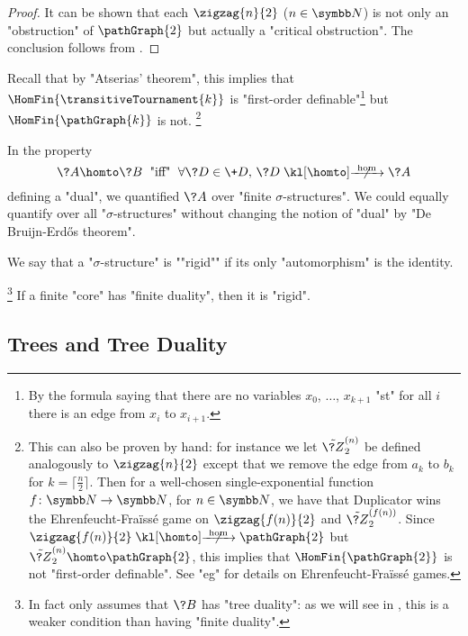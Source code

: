 \begin{proof}
	It can be shown that each $\zigzag{n}{2}$ ($n\in\N$) is not only an "obstruction" of
	$\pathGraph{2}$ but actually a "critical obstruction". The conclusion follows
	from .
\end{proof}
Recall that by "Atserias' theorem", this implies that
$\HomFin{\transitiveTournament{k}}$ is "first-order definable"\footnote{By the formula saying that
there are no variables $x_0$, $\dotsc$, $x_{k+1}$ "st" for all $i$ there is an edge from $x_i$ to $x_{i+1}$.} but $\HomFin{\pathGraph{k}}$ is not.%
\footnote{This can also be proven by hand: for 
instance we let $\tilde{\?Z}^{(n)}_2$ be defined analogously to $\zigzag{n}{2}$ except
that we remove the edge from $a_{k}$ to $b_k$ for $k = \lceil \frac{n}{2} \rceil$. 
Then for a well-chosen single-exponential function $f\colon \N \to \N$, for $n\in\N$,
we have that Duplicator wins the Ehrenfeucht-Fraïssé game on $\zigzag{f(n)}{2}$ and
$\tilde{\?Z}^{(f(n))}_2$. Since $\zigzag{f(n)}{2} \nothomto \pathGraph{2}$ but
$\tilde{\?Z}^{(n)}_2 \homto \pathGraph{2}$, this implies that $\HomFin{\pathGraph{2}}$ is not 
"first-order definable". See "eg" \cite[\S~3]{Kolaitis2007FiniteModelTheory} for details on
Ehrenfeucht-Fraïssé games.}


\begin{remark}
	In the property
	\[
		\?A \homto \?B
		\;\text{ "iff" }\;
		\forall \?D \in \+D,\, \?D \nothomto \?A
	\]
	defining a "dual", we quantified $\?A$ over "finite $\sigma$-structures". 
	We could equally quantify over all "$\sigma$-structures" without changing the notion of "dual" by "De Bruijn-Erdős theorem".
\end{remark}

We say that a "$\sigma$-structure" is \AP""rigid"" if its only "automorphism"
is the identity.
\begin{proposition}
	\!\footnote{In fact
	only assumes that $\?B$ has "tree duality": as we will see in 
	, this is a weaker condition
	than having "finite duality".}%
	\label{prop:finite-duality-implies-rigid}
	If a finite "core" has "finite duality", then it is "rigid".
\end{proposition}

\subsection{Trees and Tree Duality}

